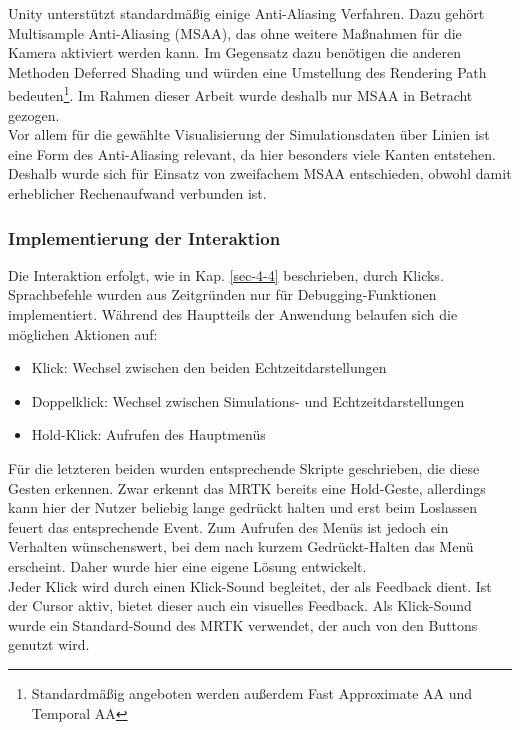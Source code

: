Unity unterstützt standardmäßig einige Anti-Aliasing Verfahren. Dazu gehört Multisample Anti-Aliasing (MSAA), das ohne weitere Maßnahmen für die Kamera aktiviert werden kann. Im Gegensatz dazu benötigen die anderen Methoden Deferred Shading und würden eine Umstellung des Rendering Path bedeuten\footnote{Standardmäßig angeboten werden außerdem Fast Approximate AA und Temporal AA}. Im Rahmen dieser Arbeit wurde deshalb nur MSAA in Betracht gezogen.\\

Vor allem für die gewählte Visualisierung der Simulationsdaten über Linien ist eine Form des Anti-Aliasing relevant, da hier besonders viele Kanten entstehen. Deshalb wurde sich für Einsatz von zweifachem MSAA entschieden, obwohl damit erheblicher Rechenaufwand verbunden ist.\\

\subsubsection{Implementierung der Interaktion}

Die Interaktion erfolgt, wie in Kap. \ref{sec-4-4} beschrieben, durch Klicks. Sprachbefehle wurden aus Zeitgründen nur für Debugging-Funktionen implementiert. 
Während des Hauptteils der Anwendung belaufen sich die möglichen Aktionen auf:

\begin{itemize}
	\setlength{\itemsep}{-1pt}
	\singlespacing
	\item Klick: Wechsel zwischen den beiden Echtzeitdarstellungen
	\item Doppelklick: Wechsel zwischen Simulations- und Echtzeitdarstellungen
	\item Hold-Klick: Aufrufen des Hauptmenüs
\end{itemize}

Für die letzteren beiden wurden entsprechende Skripte geschrieben, die diese Gesten erkennen. Zwar erkennt das MRTK bereits eine Hold-Geste, allerdings kann hier der Nutzer beliebig lange gedrückt halten und erst beim Loslassen feuert das entsprechende Event. Zum Aufrufen des Menüs ist jedoch ein Verhalten wünschenswert, bei dem nach kurzem Gedrückt-Halten das Menü erscheint. Daher wurde hier eine eigene Lösung entwickelt.\\

Jeder Klick wird durch einen Klick-Sound begleitet, der als Feedback dient. Ist der Cursor aktiv, bietet dieser auch ein visuelles Feedback. Als Klick-Sound wurde ein Standard-Sound des MRTK verwendet, der auch von den Buttons genutzt wird.\\

